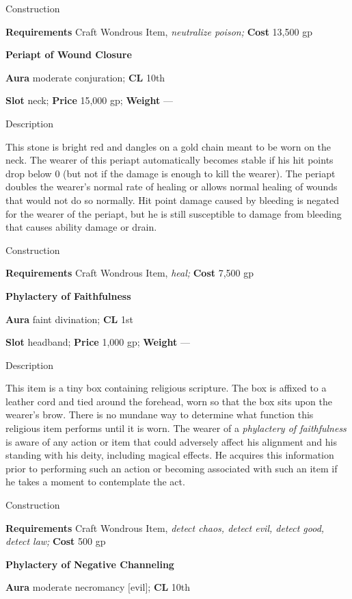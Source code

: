 Construction
				
\textbf{Requirements} Craft Wondrous Item,\textit{ neutralize poison;}\textbf{ Cost }13,500 gp
				
\textbf{Periapt of Wound Closure}
				
\textbf{Aura} moderate conjuration;\textbf{ CL }10th
				
\textbf{Slot} neck; \textbf{Price} 15,000 gp; \textbf{Weight }---
				
Description
				
This stone is bright red and dangles on a gold chain meant to be worn on the neck. The wearer of this periapt automatically becomes stable if his hit points drop below 0 (but not if the damage is enough to kill the wearer). The periapt doubles the wearer's normal rate of healing or allows normal healing of wounds that would not do so normally. Hit point damage caused by bleeding is negated for the wearer of the periapt, but he is still susceptible to damage from bleeding that causes ability damage or drain. 
				
Construction
				
\textbf{Requirements} Craft Wondrous Item,\textit{ heal;}\textbf{ Cost }7,500 gp
				
\textbf{Phylactery of Faithfulness}
				
\textbf{Aura} faint divination;\textbf{ CL }1st
				
\textbf{Slot} headband; \textbf{Price} 1,000 gp; \textbf{Weight }---
				
Description
				
This item is a tiny box containing religious scripture. The box is affixed to a leather cord and tied around the forehead, worn so that the box sits upon the wearer's brow. There is no mundane way to determine what function this religious item performs until it is worn. The wearer of a \textit{phylactery of faithfulness} is aware of any action or item that could adversely affect his alignment and his standing with his deity, including magical effects. He acquires this information prior to performing such an action or becoming associated with such an item if he takes a moment to contemplate the act. 
				
Construction
				
\textbf{Requirements} Craft Wondrous Item, \textit{detect chaos, detect evil, detect good, detect law;}\textbf{ Cost }500 gp
				
\textbf{Phylactery of Negative Channeling}
				
\textbf{Aura} moderate necromancy \mbox{$[$}evil\mbox{$]$}; \textbf{CL} 10th
				
